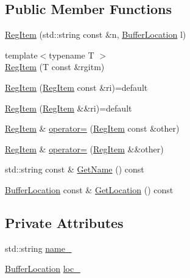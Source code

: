 \subsection*{Public Member Functions}
\begin{DoxyCompactItemize}
\item 
\hyperlink{classregistry_1_1RegItem_a48dc2248826d62afab2a3c11c3d18b96}{Reg\+Item} (std\+::string const \&n, \hyperlink{structregistry_1_1BufferLocation}{Buffer\+Location} l)
\item 
{\footnotesize template$<$typename T $>$ }\\\hyperlink{classregistry_1_1RegItem_a5950e2cc917cad4d833e5e80a29e06b5}{Reg\+Item} (T const \&rgitm)
\item 
\hyperlink{classregistry_1_1RegItem_a2c266ca9d1f6c70350aff1a7fb20b6a5}{Reg\+Item} (\hyperlink{classregistry_1_1RegItem}{Reg\+Item} const \&ri)=default
\item 
\hyperlink{classregistry_1_1RegItem_aa4f35d466ae38aa720eb54a83e666179}{Reg\+Item} (\hyperlink{classregistry_1_1RegItem}{Reg\+Item} \&\&ri)=default
\item 
\hyperlink{classregistry_1_1RegItem}{Reg\+Item} \& \hyperlink{classregistry_1_1RegItem_a25fc5c871aa9616acf4092d6cd905a3d}{operator=} (\hyperlink{classregistry_1_1RegItem}{Reg\+Item} const \&other)
\item 
\hyperlink{classregistry_1_1RegItem}{Reg\+Item} \& \hyperlink{classregistry_1_1RegItem_aff2e55eccdb5fb446dcadbbbf5cb04ca}{operator=} (\hyperlink{classregistry_1_1RegItem}{Reg\+Item} \&\&other)
\item 
std\+::string const  \& \hyperlink{classregistry_1_1RegItem_a36de17d47505b30932fb0666e151a3a5}{Get\+Name} () const
\item 
\hyperlink{structregistry_1_1BufferLocation}{Buffer\+Location} const  \& \hyperlink{classregistry_1_1RegItem_a97aa7215ece49480a08c9cce9f8ed391}{Get\+Location} () const
\end{DoxyCompactItemize}
\subsection*{Private Attributes}
\begin{DoxyCompactItemize}
\item 
std\+::string \hyperlink{classregistry_1_1RegItem_a6e5945a427995b5f881403cd155b2a22}{name\+\_\+}
\item 
\hyperlink{structregistry_1_1BufferLocation}{Buffer\+Location} \hyperlink{classregistry_1_1RegItem_aa8a85387cb5e35272674075fb73dd01e}{loc\+\_\+}
\end{DoxyCompactItemize}
